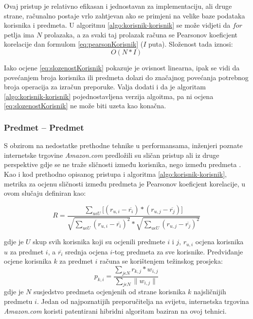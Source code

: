 \documentclass[times, utf8, diplomski, numeric]{fer}
\begin{document}
Ovaj pristup je relativno efikasan i jednostavan za implementaciju, ali druge
strane, računalno postaje vrlo zahtjevan ako se primjeni na velike baze podataka
korisnika i predmeta. U algoritmu \ref{algo:korisnik-korisnik} se može vidjeti
da $for$ petlja ima $N$ prolazaka, a za svaki taj prolazak računa se Pearsonov
koeficjent korelacije dan formulom \ref{eq:pearsonKorisnik} ($I$ puta).
Složenost tada iznosi:
\begin{equation}
\label{eq:slozenostKorisnik}
	O(N \ast I)
\end{equation}

Iako ocjene \ref{eq:slozenostKorisnik} pokazuje je ovisnost linearna,
ipak se vidi da povećanjem broja korisnika ili predmeta dolazi do
značajnog povećanja potrebnog broja operacija za izračun preporuke. 
Valja dodati i da je algoritam \ref{algo:korisnik-korisnik} pojednostavljena
verzija algoitma, pa ni ocjena \ref{eq:slozenostKorisnik} ne može biti uzeta
kao konačna.

\subsubsection{Predmet -- Predmet}
S obzirom na nedostatke prethodne tehnike u performansama, inženjeri poznate
internetske trgovine \emph{Amazon.com} predložili su sličan pristup ali iz druge
perspektive gdje se ne traže sličnosti između korisnika, nego između predmeta
\cite{amazon}. Kao i kod prethodno opisanog pristupa i algoritma
\ref{algo:korisnik-korisnik}, metrika za ocjenu sličnosti između predmeta je
Pearsonov koeficjent korelacije, u ovom slučaju definiran kao:

\begin{equation}
\label{eq:pearsonPredmet}
	R = \frac
			{\sum_{u \epsilon U} 
				\big[
					(r_{u,i} - \overline{r_i}) \ast
					(r_{u,j} - \overline{r_j})
				\big]
			}
			{
				\sqrt{{\sum_{u \epsilon U} (r_{u,i} - \overline{r_i})^2}} \ast 
				\sqrt{{\sum_{u \epsilon U} (r_{u,j} - \overline{r_j})^2}}
			}
\end{equation}

gdje je $U$ skup svih korisnika koji su ocjenili predmete $i$ i $j$, $r_{u,i}$
ocjena korisnika $u$ za predmet $i$, a $\overline{r_i}$ srednja ocjena $i$-tog
predmeta za sve korisnike. Predviđanje ocjene korisnika $k$ za predmet $i$
računa se korištenjem težinskog prosjeka:
\begin{equation}
\label{eq:tezinskiProsjek}
	p_{k,i} = 
		\frac
			{\sum_{j \epsilon N} r_{k,j} \ast w_{i,j}}
			{\sum_{j \epsilon N} \|w_{i,j}\|}
\end{equation}
gdje je $N$ susjedstvo predmeta ocjenjenih od strane korisnika $k$ najsličnijih
predmetu $i$. Jedan od najpoznatijih preporučitelja na svijetu, internetska
trgovina \emph{Amazon.com} koristi patentirani hibridni algoritam baziran na
ovoj tehnici.
\end{document}

